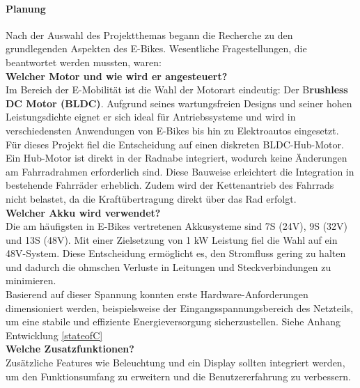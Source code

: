 \documentclass[paper=a4,11pt]{scrreprt}
\begin{document}
\paragraph{Planung}
Nach der Auswahl des Projektthemas begann die Recherche zu den grundlegenden Aspekten des E-Bikes. Wesentliche Fragestellungen, die beantwortet werden mussten, waren:\\
\textbf{Welcher Motor und wie wird er angesteuert?\\}
Im Bereich der E-Mobilität ist die Wahl der Motorart eindeutig: Der B\textbf{rushless DC Motor (BLDC)}. Aufgrund seines wartungsfreien Designs und seiner hohen Leistungsdichte eignet er sich ideal für Antriebssysteme und wird in verschiedensten Anwendungen von E-Bikes bis hin zu Elektroautos eingesetzt.\\
Für dieses Projekt fiel die Entscheidung auf einen diskreten BLDC-Hub-Motor. Ein Hub-Motor ist direkt in der Radnabe integriert, wodurch keine Änderungen am Fahrradrahmen erforderlich sind. Diese Bauweise erleichtert die Integration in bestehende Fahrräder erheblich. Zudem wird der Kettenantrieb des Fahrrads nicht belastet, da die Kraftübertragung direkt über das Rad erfolgt.\\
\textbf{Welcher Akku wird verwendet?\\}
Die am häufigsten in E-Bikes vertretenen Akkusysteme sind 7S (24V), 9S (32V) und 13S (48V). Mit einer Zielsetzung von 1 kW Leistung fiel die Wahl auf ein 48V-System. Diese Entscheidung ermöglicht es, den Stromfluss gering zu halten und dadurch die ohmschen Verluste in Leitungen und Steckverbindungen zu minimieren.\\
Basierend auf dieser Spannung konnten erste Hardware-Anforderungen dimensioniert werden, beispielsweise der Eingangsspannungsbereich des Netzteils, um eine stabile und effiziente Energieversorgung sicherzustellen. Siehe Anhang Entwicklung \ref{stateofC}\\
\textbf{Welche Zusatzfunktionen?}\\
Zusätzliche Features wie Beleuchtung und ein Display sollten integriert werden, um den Funktionsumfang zu erweitern und die Benutzererfahrung zu verbessern.
\end{document}
